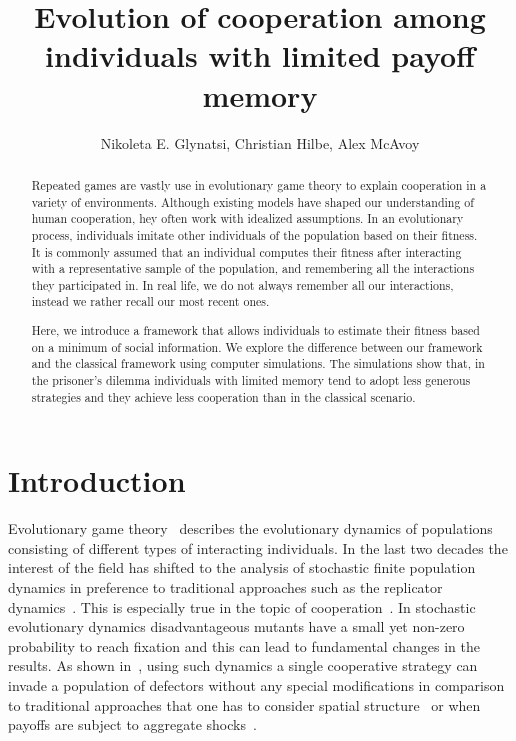 \documentclass[11pt]{article}
\title{\bf  \sffamily \LARGE Evolution of cooperation among individuals with
limited payoff memory\\}
\date{}
\author{Nikoleta E. Glynatsi, Christian Hilbe, Alex McAvoy}
\theoremstyle{plainCl1}
\theoremstyle{plainCl2}
\begin{document}
\maketitle

\begin{abstract}
Repeated games are vastly use in evolutionary game theory to explain cooperation
in a variety of environments. Although existing models have shaped our
understanding of human cooperation, hey often work with idealized assumptions.
In an evolutionary process, individuals imitate other individuals of the
population based on their fitness. It is commonly assumed that an individual
computes their fitness after interacting with a representative sample of the
population, and remembering all the interactions they participated in. In real
life, we do not always remember all our interactions, instead we rather recall
our most recent ones.

Here, we introduce a framework that allows individuals to estimate their fitness
based on a minimum of social information. We explore the difference between our
framework and the classical framework using computer simulations. The
simulations show that, in the prisoner's dilemma individuals with limited memory
tend to adopt less generous strategies and they achieve less cooperation than in
the classical scenario.
\end{abstract}

\section{Introduction}

Evolutionary game theory~\cite{smith1982evolution, hofbauer1998evolutionary,
nowak:Nature:2004, hauert2005game} describes the evolutionary dynamics of
populations consisting of different types of interacting individuals. In the
last two decades the interest of the field has shifted to the analysis of
stochastic finite population dynamics in preference to traditional approaches
such as the replicator dynamics~\cite{hofbauer:JTB:1979, taylor:MATHBIO:1978}.
This is especially true in the topic of cooperation~\cite{hilbe:PNAS:2013,
hilbe:Nature:2018,glynatsi:SCR:2020}. In stochastic evolutionary dynamics
disadvantageous mutants have a small yet non-zero probability to reach fixation
and this can lead to fundamental changes in the results. As shown
in~\cite{nowak:Nature:2004}, using such dynamics a single cooperative strategy
can invade a population of defectors without any special modifications in
comparison to traditional approaches that one has to consider spatial
structure~\cite{nowak:Nature:1992} or when payoffs are subject to aggregate
shocks~\cite{fudenberg:JET:1992}.
\end{document}
